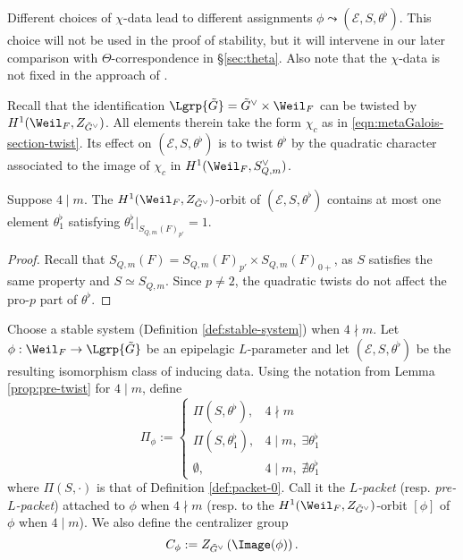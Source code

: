 \documentclass[a4paper,10pt]{article}
\begin{document}
\begin{remark}
	Different choices of $\chi$-data lead to different assignments $\phi \leadsto (\mathcal{E}, S, \theta^\flat)$. This choice will not be used in the proof of stability, but it will intervene in our later comparison with $\Theta$-correspondence in \S\ref{sec:theta}. Also note that the $\chi$-data is not fixed in the approach of \cite{Kal16}.
\end{remark}

Recall that the identification $\Lgrp{\tilde{G}} = \tilde{G}^\vee \times \Weil_F$ can be twisted by $H^1(\Weil_F, Z_{\tilde{G}^\vee})$. All elements therein take the form $\chi_c$ as in \eqref{eqn:metaGalois-section-twist}. Its effect on $(\mathcal{E}, S, \theta^\flat)$ is to twist $\theta^\flat$ by the quadratic character associated to the image of $\chi_c$ in $H^1(\Weil_F, S_{Q,m}^\vee)$.
\begin{lemma}\label{prop:pre-twist}
	Suppose $4 \mid m$. The $H^1(\Weil_F, Z_{\tilde{G}^\vee})$-orbit of $(\mathcal{E}, S, \theta^\flat)$ contains at most one element $\theta^\flat_1$ satisfying $\theta^\flat_1|_{S_{Q,m}(F)_{p'}} = 1$.
\end{lemma}
\begin{proof}
	Recall that $S_{Q,m}(F) = S_{Q,m}(F)_{p'} \times S_{Q,m}(F)_{0+}$, as $S$ satisfies the same property and $S \simeq S_{Q,m}$. Since $p \neq 2$, the quadratic twists do not affect the pro-$p$ part of $\theta^\flat$.
\end{proof}

\begin{definition}[$L$-packets]\label{def:epipelagic-packet} \index{$\Pi_\phi, \Pi_{[\phi]}$}
	Choose a stable system (Definition \ref{def:stable-system}) when $4 \nmid m$. Let $\phi: \Weil_F \to \Lgrp{\tilde{G}}$ be an epipelagic $L$-parameter and let $(\mathcal{E}, S, \theta^\flat)$ be the resulting isomorphism class of inducing data. Using the notation from Lemma \ref{prop:pre-twist} for $4 \mid m$, define
	\[ \Pi_\phi := \begin{cases}
		\Pi(S, \theta^\flat), & 4 \nmid m \\
		\Pi(S, \theta^\flat_1), & 4 \mid m, \; \exists \theta^\flat_1 \\
		\emptyset, & 4 \mid m, \; \nexists \theta^\flat_1
	\end{cases}\]
	where $\Pi(S, \cdot)$ is that of Definition \ref{def:packet-0}. Call it the \emph{$L$-packet} (resp. \emph{pre-$L$-packet}) attached to $\phi$ when $4 \nmid m$ (resp. to the $H^1(\Weil_F, Z_{\tilde{G}^\vee})$-orbit $[\phi]$ of $\phi$ when $4 \mid m$). We also define the centralizer group
	\[ C_\phi := Z_{\tilde{G}^\vee}\left( \Image(\phi) \right). \]
\end{definition}
\end{document}
